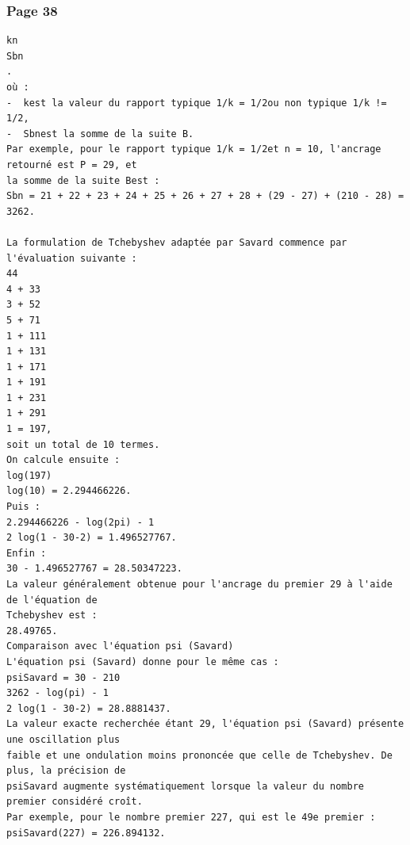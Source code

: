 \documentclass[11pt,a4paper]{article}
\begin{document}
\subsubsection*{Page 38}
\begin{Verbatim}[fontsize=\footnotesize]
kn
Sbn
. 
où : 
-  kest la valeur du rapport typique 1/k = 1/2ou non typique 1/k != 1/2, 
-  Sbnest la somme de la suite B. 
Par exemple, pour le rapport typique 1/k = 1/2et n = 10, l'ancrage retourné est P = 29, et 
la somme de la suite Best : 
Sbn = 21 + 22 + 23 + 24 + 25 + 26 + 27 + 28 + (29 - 27) + (210 - 28) = 3262. 
 
La formulation de Tchebyshev adaptée par Savard commence par l'évaluation suivante : 
44
4 + 33
3 + 52
5 + 71
1 + 111
1 + 131
1 + 171
1 + 191
1 + 231
1 + 291
1 = 197, 
soit un total de 10 termes. 
On calcule ensuite : 
log(197)
log(10) = 2.294466226. 
Puis : 
2.294466226 - log(2pi) - 1
2 log(1 - 30-2) = 1.496527767. 
Enfin : 
30 - 1.496527767 = 28.50347223. 
La valeur généralement obtenue pour l'ancrage du premier 29 à l'aide de l'équation de
Tchebyshev est : 
28.49765. 
Comparaison avec l'équation psi (Savard) 
L'équation psi (Savard) donne pour le même cas : 
psiSavard = 30 - 210
3262 - log(pi) - 1
2 log(1 - 30-2) = 28.8881437. 
La valeur exacte recherchée étant 29, l'équation psi (Savard) présente une oscillation plus 
faible et une ondulation moins prononcée que celle de Tchebyshev. De plus, la précision de 
psiSavard augmente systématiquement lorsque la valeur du nombre premier considéré croît.
Par exemple, pour le nombre premier 227, qui est le 49e premier : 
psiSavard(227) = 226.894132. 
\end{Verbatim}
\medskip
\end{document}
